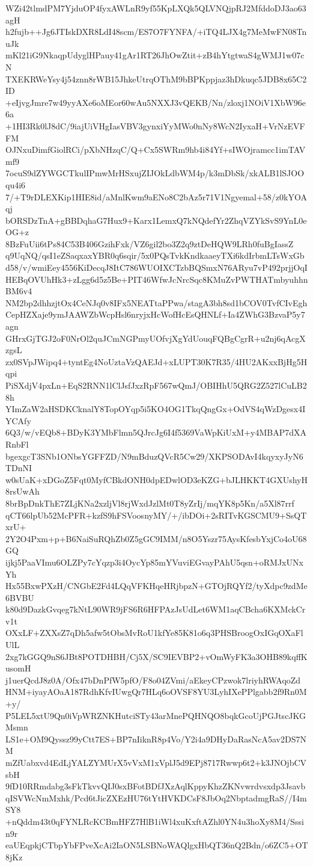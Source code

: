 WZi42tlmdPM7YjduOP4fyxAWLnR9yf55KpLXQk5QLVNQjpRJ2MfddoDJ3ao63agH
h2fujb++Jg6JTIskDXR8LdI48scm/ES7O7FYNFA/+iTQ4LJX4g7MeMwFN08TnuJk
mKl21iG9NkaqpUdyglHPauy41gAr1RT26JhOwZtit+zB4hYtgtwaS4gWMJ1w07cN
TXEKRWeYsy4j54znn8rWB15JhkeUtrqOThM9bBPKppjaz3hDkuqc5JDB8x65C2ID
+eIjvgJmre7w49yyAXe6oMEor60wAu5NXXJ3vQEKB/Nn/zloxj1NOiV1XbW96e6a
+1HI3Rk0lJ8dC/9iajUiVHgIasVBV3gynxiYyMWo0nNy8WcN2IyxaH+VrNzEVFFM
OJNxuDimfGiolRCi/pXbNHzqC/Q+Cx5SWRm9hb4i84Yf+sIWOjramcc1imTAVmf9
7ocuS9dZYWGCTkulIPmwMrHSxujZIJOkLdbWM4p/k3mDbSk/xkALB1lSJOOqu4i6
7/+T9rDLEXKip1HIE8id/aMnlKwm9aENo8C2bAz5r71V1Ngyemal+58/z0kYOAqj
bORSDzTnA+gBBDqhaG7Hux9+Karx1LemxQ7kNQdefYr2ZhqVZYkSvS9YnL0eOG+z
8BzFuUii6tPs84C53B406GzihFxk/VZ6gil2bo3Z2q9ztDeHQW9LRh0fuBgIassZ
q9UqNQ/qsI1eZSaqxaxYBR0q6sqir/5x0PQsTvkKndkaaeyTXi6kdIrbmLTsWxGb
d58/v/wmiEey4556KiDecqJ8ItC786WUOIXCTzbBQSmxN76ARyu7vP492prjjOqI
HEBqOVUhHk3+zLgg6d5z5Be+PIT46WfwJcNrcSqc8KMuZvPWTHATmbyuhhnBM6v4
NM2bp2dhhzjtOx4CeNJq0v8IFx5NEATtaPPwa/stagA3bh8sd1bCOV0TvfCIvEgh
CepHZXaje9ymJAAWZbWcpHsl6nryjxHcWofHcEsQHNLf+Ia4ZWhG3BzvaP5y7agn
GHrxGjTGJ2oF0NrOl2quJCmNGPmyUOfvjXgYdUouqFQBgCgrR+u2nj6qAcgXzgsL
zx0SVpJWipq4+tyntEg4NoUztaVzQAEJd+xLUPT30K7R35/4HU2AKxxBjHg5Hqpi
PiSXdjV4pxLn+EqS2RNN1lClJsfJxzRpF567wQmJ/OBIHhU5QRG2Z527lCuLB28h
YImZaW2aHSDKCknalY8TopOYqp5i5KO4OG1TkqQngGx+OdVS4qWzDgesx4IYCAfy
6Q3/w/vEQb8+BDyK3YMbFlmn5QJrcJg6I4f5369VaWpKiUxM+y4MBAP7dXARnbFl
bgexgcT3SNb1ONbsYGFFZD/N9mBduzQVcR5Cw29/XKPSODAvI4kqyxyJyN6TDnNI
w0sUaK+xDGoZ5Fqt0MyfCBkdONH0dpEDwlOD3eKZG+bJLHKKT4GXUshyH8rsUwAh
8brBpDnkThE7ZLjKNa2xzljVl8rjWxdJzlMt0T8yZrIj/mqYK8p5Kn/a5Xl87rrf
qCT66lpUb52McPFR+kzfS9hFSVoosnyMY/+/ibDOi+2sRITvKGSCMU9+SsQTxrU+
2Y2O4Pxm+p+B6NaiSuRQhZb0Z5gGC9IMM/n8O5Yszr75AysKfesbYxjCo4oU68GQ
ijkj5PaaVImu6OLZPy7cYqzp3i4OycYp85mYVuviEGvayPAhU5qsn+oRMJxUNxYh
Hx55BxwPXzH/CNGbE2Fd4LQqVFKHqeHRjbpzN+GTOjRQYf2/tyXdpc9zdMe6BVBU
k80d9DazkGvqeg7kNtL90WR9jFS6R6HFPAzJsUdLet6WM1aqCBcha6KXMckCrv1t
OXxLF+ZXXsZ7qDh5afw5tObsMvRoU1kfYe85K81o6q3PHSBroogOxIGqOXaFlUlL
2xg7kGGQ9nS6JBt8POTDHBH/Cj5X/SC9IEVBP2+vOmWyFK3a3OHB89kqffKusomH
j1uerQcdJ8z0A/Ofx47bDnPfW5pfO/F8o04ZVmi/aEkeyCPzwok7lriyhRWAqoZd
HNM+iyayAOaA187RdhKfvIUwgQr7HLq6oOVSF8YU3LyhIXePPlgabb2f9Rn0M+y/
P5LEL5xtU9Qn0iVpWRZNKHutciSTy43arMnePQHNQO8bqkGcoUjPGJtscJKGMsmn
LS1e+OM9Qyssz99yCtt7ES+BP7nIiknR8p4Vo/Y2i4a9DHyDaRasNcA5av2DS7NM
mZfUabxvd4EdLjYALZYMUrX5vVxM1xVplJ5d9EPj8717Rwwp6t2+k3JNOjbCVsbH
9fD10RRmdabg3sFkTkvvQIJ0sxBFotBDfJXzAqlKppyKhzZKNvwrdvsxdp3Jsavb
qISVWcNmMxhk/Pcd6tJicZXEzHU76tYtHVKDCsF8JbOq2NbptadmgRaS//I4mSY8
+nQddm43t0qFYNLRcKCBmHFZ7HlB1iWl4xuKxftAZhl0YN4u3hoXy8M4/Sssin9r
eaUEqpkjCTbpYbFPveXcAi2IaON5LSBNoWAQlgxHbQT36nQ2Bdn/o6ZC5+OT8jKz

